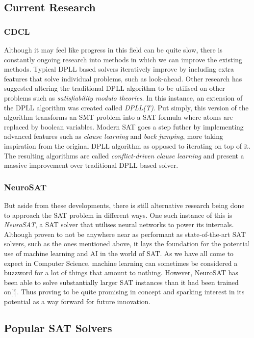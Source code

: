 \documentclass{article}
\begin{document}
\subsection{Current Research}
\subsubsection{CDCL}
Although it may feel like progress in this field can be quite slow, there is constantly ongoing research into methods in which we
can improve the existing methods. Typical DPLL based solvers iteratively improve by including extra features that solve individual
problems, such as look-ahead. Other research has suggested altering the traditional DPLL algorithm to be utilised on other
problems such as \textit{satisfiability modulo theories}. In this instance, an extension of the DPLL algorithm was created called
\textit{DPLL(T)}. Put simply, this version of the algorithm transforms an SMT problem into a SAT formula where atoms are replaced
by boolean variables. Modern SAT goes a step futher by implementing advanced features such as \textit{clause learning} and
\textit{back jumping}, more taking inspiration from the original DPLL algorithm as opposed to iterating on top of it. The
resulting algorithms are called \textit{conflict-driven clause learning} and present a massive improvement over traditional DPLL
based solver.

\subsubsection{NeuroSAT}
But aside from these developments, there is still alternative research being done to approach the SAT problem in different ways.
One such instance of this is \textit{NeuroSAT}, a SAT solver that utilises neural networks to power its internals. Although proven
to not be anywhere near as performant as state-of-the-art SAT solvers, such as the ones mentioned above, it lays the foundation
for the potential use of machine learning and AI in the world of SAT. As we have all come to expect in Computer Science, machine
learning can sometimes be considered a buzzword for a lot of things that amount to nothing. However, NeuroSAT has been able to
solve substantially larger SAT instances than it had been trained on[!]. Thus proving to be quite promising in concept and
sparking interest in its potential as a way forward for future innovation.

\subsection{Popular SAT Solvers}
\end{document}
